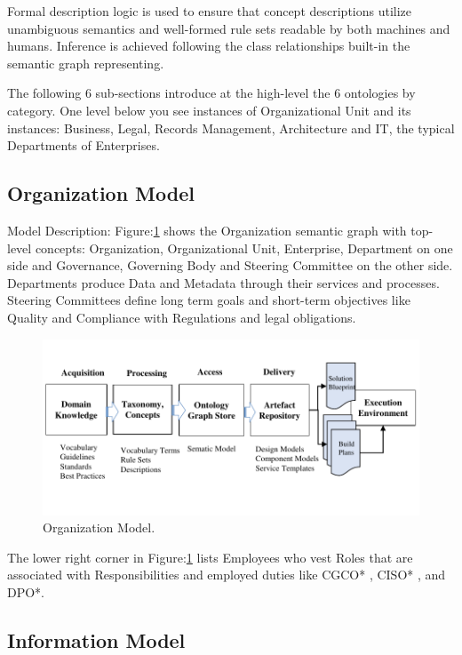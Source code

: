 \documentclass[runningheads]{llncs}
\begin{document}
Formal description logic is used to ensure that concept descriptions utilize unambiguous semantics and well-formed rule sets readable by both machines and humans. Inference is achieved following the class relationships built-in the semantic graph representing. 

The following 6 sub-sections introduce at the high-level the 6 ontologies by category. One level below you see instances of Organizational Unit and its instances: Business, Legal, Records Management, Architecture and IT, the typical Departments of Enterprises.

\subsection{Organization Model}

Model Description: Figure:\ref{fig5} shows the Organization semantic graph with top-level concepts: Organization, Organizational Unit, Enterprise, Department on one side and Governance, Governing Body and Steering Committee on the other side. Departments produce Data and Metadata through their services and processes. Steering Committees define long term goals and short-term objectives like Quality and Compliance with Regulations and legal obligations.  

 \begin{figure}[h] 
 \centering
\includegraphics[page=5,trim=0 0.5cm 0 1cm,clip, width=\textwidth]{figs/IGSModelsMedium.pdf}
\caption{Organization Model.} \label{fig5}
\end{figure} 

The lower right corner in Figure:\ref{fig5} lists Employees who vest Roles that are associated with Responsibilities and employed duties like CGCO* , CISO* , and DPO*.
\subsection{Information Model}
\end{document}
